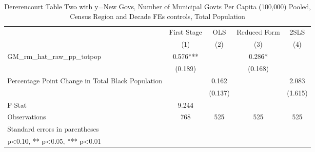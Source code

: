\begin{table}[htbp]\centering
\def\sym#1{\ifmmode^{#1}\else\(^{#1}\)\fi}
\caption{Dererencourt Table Two with y=New Govs, Number of Municipal Govts Per Capita (100,000) Pooled, Census Region and Decade FEs controls, Total Population}
\begin{tabular}{l*{4}{c}}
\toprule
                    & First Stage   &         OLS   &Reduced Form   &        2SLS   \\
                    &\multicolumn{1}{c}{(1)}   &\multicolumn{1}{c}{(2)}   &\multicolumn{1}{c}{(3)}   &\multicolumn{1}{c}{(4)}   \\
\midrule
GM\_rm\_hat\_raw\_pp\_totpop&       0.576***&               &       0.286*  &               \\
                    &     (0.189)   &               &     (0.168)   &               \\
\addlinespace
Percentage Point Change in Total Black Population&               &       0.162   &               &       2.083   \\
                    &               &     (0.137)   &               &     (1.615)   \\
\midrule
F-Stat              &       9.244   &               &               &               \\
Observations        &         768   &         525   &         525   &         525   \\
\bottomrule
\multicolumn{5}{l}{\footnotesize Standard errors in parentheses}\\
\multicolumn{5}{l}{\footnotesize * p<0.10, ** p<0.05, *** p<0.01}\\
\end{tabular}
\end{table}
